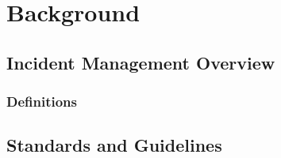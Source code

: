 \chapter{Background}

\section{Incident Management Overview}
\subsection{Definitions}

\section{Standards and Guidelines}

